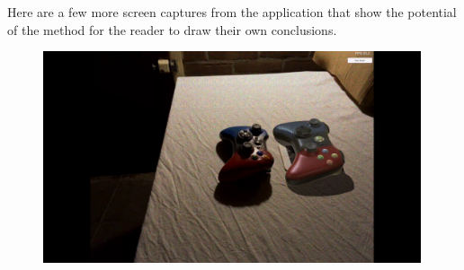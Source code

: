 Here are a few more screen captures from the application that show the potential of the method for the reader to draw their own conclusions.

\begin{figure}[H]
    \centering
    \begin{minipage}{0.5\textwidth}
        \centering
        \includegraphics[width=0.99\textwidth]{Figures/ContBoth.png} %
 

\end{minipage}
\end{figure}
